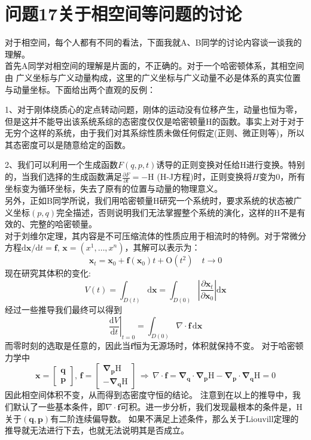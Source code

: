 \documentclass[utf8]{ctexart}
\author{syx}
\begin{document}
	\section*{问题17\quad 关于相空间等问题的讨论}
	
	对于相空间，每个人都有不同的看法，下面我就A、B同学的讨论内容谈一谈我的理解。\\

	首先A同学对相空间的理解是片面的，不正确的。对于一个哈密顿体系，其相空间由
	广义坐标与广义动量构成，这里的广义坐标与广义动量不必是体系的真实位置与动量坐标。下面给出两个直观的反例：

	1、对于刚体绕质心的定点转动问题，刚体的运动没有位移产生，动量也恒为零，但是这并不能导出该系统系综的态密度仅仅是哈密顿量$\mathrm{H}$的函数。事实上对于对于无穷个这样的系统，由于我们对其系综性质未做任何假定(正则、微正则等)，所以其态密度可以是随意给定的函数。

	2、我们可以利用一个生成函数$F(q,p,t)$诱导的正则变换对任给$\mathrm{H}$进行变换。特别的，当我们选择的生成函数满足$\frac{\partial{F}}{\partial{t}}=-\mathrm{H}$
	(H-J方程)时，正则变换将$H$变为0，所有坐标变为循环坐标，失去了原有的位置与动量的物理意义。\\

	另外，正如B同学所说，我们用哈密顿量$\mathrm{H}$研究一个系统时，要求系统的状态被广义坐标$(p,q)$完全描述，否则说明我们无法掌握整个系统的演化，这样的$\mathrm{H}$不是有效的、完整的哈密顿量。\\
	
	对于刘维尔定理，其内容是不可压缩流体的性质应用于相流时的特例。对于常微分方程$\mathrm{d}\mathbf{x}/\mathrm{d}t=\mathbf{f},\,\mathbf{x}=(x^1,\dots,x^n)$，其解可以表示为：
	\[\mathbf{x}_t=\mathbf{x}_0+\mathbf{f}(\mathbf{x}_0)t+\mathrm{O}(t^2)\quad t\to0 \]
	现在研究其体积的变化:
	\[V(t)=\int_{D(t)}\mathrm{d}\mathbf{x}
	=\int_{D(0)}\left|\frac{\partial{\mathbf{x}_t}}{\partial{\mathbf{x}_0}}\right| \mathrm{d}\mathbf{x} \]
	经过一些推导我们最终可以得到
	\[\left. \frac{\mathrm{d}V}{\mathrm{d}t}\right|_{t=0}
	=\int_{D(0)}\nabla \cdot\mathbf{f}\,\mathrm{d}\mathbf{x}\]
	而零时刻的选取是任意的，因此当$\mathbf{f}$恒为无源场时，体积就保持不变。
	\clearpage\noindent
	对于哈密顿力学中
	\[\mathbf{x}=\begin{bmatrix}
	\mathbf{q}\\
	\mathbf{p}     
	\end{bmatrix},\,
	\mathbf{f}=\begin{bmatrix}
	\mathbf{\nabla_p}\mathrm{H}\\
	-\mathbf{\nabla_q}\mathrm{H}     
	\end{bmatrix}\,
	\Rightarrow\,
	\nabla \cdot\mathbf{f}=\mathbf{\nabla_q}\cdot\mathbf{\nabla_p}\mathrm{H}
	-\mathbf{\nabla_p}\cdot\mathbf{\nabla_q}\mathrm{H}=0
	\]
	因此相空间体积不变，从而得到态密度守恒的结论。
	注意到在以上的推导中，我们默认了一些基本条件，即$\nabla\cdot\mathbf{f}$可积。进一步分析，我们发现最根本的条件是，H关于$(\mathbf{q},\mathbf{p})$有二阶连续偏导数。
	如果不满足上述条件，那么关于Liouvill定理的推导就无法进行下去，也就无法说明其是否成立。\\
\end{document}
